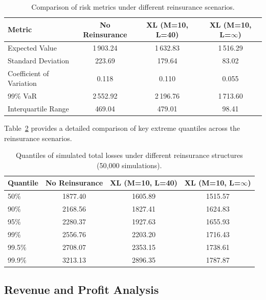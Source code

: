 \documentclass[8pt]{article}
\begin{document}
\begin{table}[h]
    \centering
    \begin{tabular}{lccc}
        \toprule
        \textbf{Metric} & \textbf{No Reinsurance} & \textbf{XL (M=10, L=40)} & \textbf{XL (M=10, L=$\infty$)} \\
        \midrule
        Expected Value & 1\,903.24 & 1\,632.83 & 1\,516.29 \\
        Standard Deviation & 223.69 & 179.64 & 83.02 \\
        Coefficient of Variation & 0.118 & 0.110 & 0.055 \\
        99\% VaR & 2\,552.92 & 2\,196.76 & 1\,713.60 \\
        Interquartile Range & 469.04 & 479.01 & 98.41 \\
        \bottomrule
    \end{tabular}
    \vspace{1em}
    \caption{Comparison of risk metrics under different reinsurance scenarios.}
    \label{tab:risk-metrics}
\end{table}

Table~\ref{tab:quantiles} provides a detailed comparison of key extreme quantiles across the reinsurance scenarios.

\begin{table}[h]
    \centering
    \begin{tabular}{lccc}
        \toprule
        \textbf{Quantile} & \textbf{No Reinsurance} & \textbf{XL (M=10, L=40)} & \textbf{XL (M=10, L=$\infty$)} \\
        \midrule
        50\% & 1877.40 & 1605.89 & 1515.57 \\
        90\% & 2168.56 & 1827.41 & 1624.83 \\
        95\% & 2280.37 & 1927.63 & 1655.93 \\
        99\% & 2556.76 & 2203.20 & 1716.43 \\
        99.5\% & 2708.07 & 2353.15 & 1738.61 \\
        99.9\% & 3213.13 & 2896.35 & 1787.87 \\
        \bottomrule
    \end{tabular}
    \vspace{1em}
    \caption{Quantiles of simulated total losses under different reinsurance structures (50,000 simulations).}
    \label{tab:quantiles}
\end{table}

\subsection{Revenue and Profit Analysis}
\end{document}
